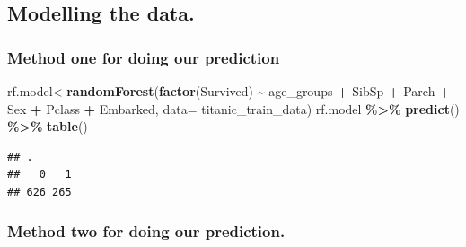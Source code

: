 \documentclass[
]{article}
\newenvironment{Shaded}{\begin{snugshade}}{\end{snugshade}}
\newcommand{\AttributeTok}[1]{\textcolor[rgb]{0.13,0.29,0.53}{#1}}
\newcommand{\ConstantTok}[1]{\textcolor[rgb]{0.56,0.35,0.01}{#1}}
\newcommand{\DecValTok}[1]{\textcolor[rgb]{0.00,0.00,0.81}{#1}}
\newcommand{\FloatTok}[1]{\textcolor[rgb]{0.00,0.00,0.81}{#1}}
\newcommand{\FunctionTok}[1]{\textcolor[rgb]{0.13,0.29,0.53}{\textbf{#1}}}
\newcommand{\NormalTok}[1]{#1}
\newcommand{\OtherTok}[1]{\textcolor[rgb]{0.56,0.35,0.01}{#1}}
\newcommand{\SpecialCharTok}[1]{\textcolor[rgb]{0.81,0.36,0.00}{\textbf{#1}}}
\begin{document}
\hypertarget{modelling-the-data.}{%
\subsection{Modelling the data.}\label{modelling-the-data.}}

\hypertarget{method-one-for-doing-our-prediction}{%
\subsubsection{Method one for doing our
prediction}\label{method-one-for-doing-our-prediction}}

\begin{Shaded}
\begin{Highlighting}[]
\NormalTok{rf.model}\OtherTok{\textless{}{-}}\FunctionTok{randomForest}\NormalTok{(}\FunctionTok{factor}\NormalTok{(Survived) }\SpecialCharTok{\textasciitilde{}}\NormalTok{  age\_groups }\SpecialCharTok{+}\NormalTok{ SibSp }\SpecialCharTok{+}\NormalTok{ Parch }\SpecialCharTok{+}\NormalTok{ Sex }\SpecialCharTok{+}\NormalTok{ Pclass }\SpecialCharTok{+}\NormalTok{ Embarked, }\AttributeTok{data=}\NormalTok{ titanic\_train\_data)}
\NormalTok{rf.model }\SpecialCharTok{\%\textgreater{}\%}
  \FunctionTok{predict}\NormalTok{() }\SpecialCharTok{\%\textgreater{}\%}
  \FunctionTok{table}\NormalTok{()}
\end{Highlighting}
\end{Shaded}

\begin{verbatim}
## .
##   0   1 
## 626 265
\end{verbatim}

\hypertarget{method-two-for-doing-our-prediction.}{%
\subsubsection{Method two for doing our
prediction.}\label{method-two-for-doing-our-prediction.}}

\begin{Shaded}
\end{Shaded}
\end{document}

